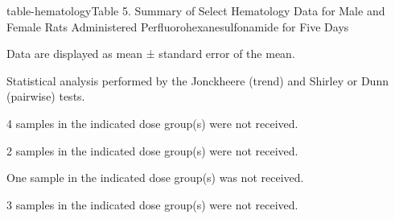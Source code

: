 \begin{landscape}
\begin{niehstable}{table-hematology}{Table 5. Summary of Select Hematology Data for Male and Female Rats Administered Perfluorohexanesulfonamide for Five Days}
\begin{tablenotes}
\item[a] Data are displayed as mean ± standard error of the mean.
\item[b] Statistical analysis performed by the Jonckheere (trend) and Shirley or Dunn (pairwise) tests.
\item[c] 4 samples in the indicated dose group(s) were not received.
\item[d] 2 samples in the indicated dose group(s) were not received.
\item[e] One sample in the indicated dose group(s) was not received.
\item[f] 3 samples in the indicated dose group(s) were not received.
\end{tablenotes}
\end{niehstable}
\end{landscape}

